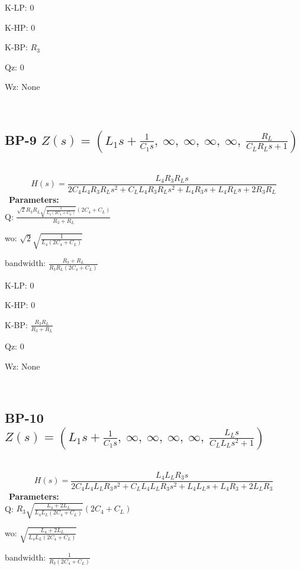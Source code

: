 \documentclass{article}
\begin{document}
K-LP: $0$\ 

K-HP: $0$\ 

K-BP: $R_{3}$\ 

Qz: $0$\ 

Wz: $\text{None}$\ 

\ 

\subsection{BP-9 $Z(s) = \left( L_{1} s + \frac{1}{C_{1} s}, \  \infty, \  \infty, \  \infty, \  \infty, \  \frac{R_{L}}{C_{L} R_{L} s + 1}\right)$ } \ 
\textbf{\[H(s) = \frac{L_{4} R_{3} R_{L} s}{2 C_{4} L_{4} R_{3} R_{L} s^{2} + C_{L} L_{4} R_{3} R_{L} s^{2} + L_{4} R_{3} s + L_{4} R_{L} s + 2 R_{3} R_{L}}\] } \ 
\textbf{Parameters:}\\ 

Q: $\frac{\sqrt{2} R_{3} R_{L} \sqrt{\frac{1}{L_{4} \left(2 C_{4} + C_{L}\right)}} \left(2 C_{4} + C_{L}\right)}{R_{3} + R_{L}}$\ 

wo: $\sqrt{2} \sqrt{\frac{1}{L_{4} \left(2 C_{4} + C_{L}\right)}}$\ 

bandwidth: $\frac{R_{3} + R_{L}}{R_{3} R_{L} \left(2 C_{4} + C_{L}\right)}$\ 

K-LP: $0$\ 

K-HP: $0$\ 

K-BP: $\frac{R_{3} R_{L}}{R_{3} + R_{L}}$\ 

Qz: $0$\ 

Wz: $\text{None}$\ 

\ 

\subsection{BP-10 $Z(s) = \left( L_{1} s + \frac{1}{C_{1} s}, \  \infty, \  \infty, \  \infty, \  \infty, \  \frac{L_{L} s}{C_{L} L_{L} s^{2} + 1}\right)$ } \ 
\textbf{\[H(s) = \frac{L_{4} L_{L} R_{3} s}{2 C_{4} L_{4} L_{L} R_{3} s^{2} + C_{L} L_{4} L_{L} R_{3} s^{2} + L_{4} L_{L} s + L_{4} R_{3} + 2 L_{L} R_{3}}\] } \ 
\textbf{Parameters:}\\ 

Q: $R_{3} \sqrt{\frac{L_{4} + 2 L_{L}}{L_{4} L_{L} \left(2 C_{4} + C_{L}\right)}} \left(2 C_{4} + C_{L}\right)$\ 

wo: $\sqrt{\frac{L_{4} + 2 L_{L}}{L_{4} L_{L} \left(2 C_{4} + C_{L}\right)}}$\ 

bandwidth: $\frac{1}{R_{3} \left(2 C_{4} + C_{L}\right)}$\ 
\end{document}
